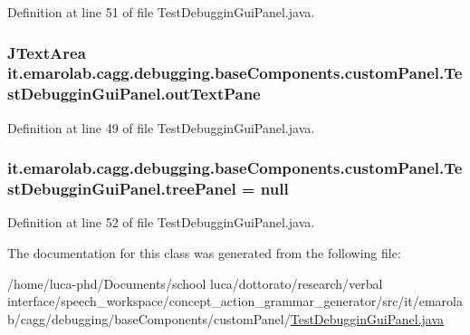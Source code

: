 Definition at line 51 of file Test\-Debuggin\-Gui\-Panel.\-java.

\hypertarget{classit_1_1emarolab_1_1cagg_1_1debugging_1_1baseComponents_1_1customPanel_1_1TestDebugginGuiPanel_a34bd5791b202b681798d7f3928550ec5}{
\subsubsection[{out\-Text\-Pane}]{\setlength{\rightskip}{0pt plus 5cm}J\-Text\-Area it.\-emarolab.\-cagg.\-debugging.\-base\-Components.\-custom\-Panel.\-Test\-Debuggin\-Gui\-Panel.\-out\-Text\-Pane\hspace{0.3cm}{\ttfamily [private]}}}\label{classit_1_1emarolab_1_1cagg_1_1debugging_1_1baseComponents_1_1customPanel_1_1TestDebugginGuiPanel_a34bd5791b202b681798d7f3928550ec5}


Definition at line 49 of file Test\-Debuggin\-Gui\-Panel.\-java.

\hypertarget{classit_1_1emarolab_1_1cagg_1_1debugging_1_1baseComponents_1_1customPanel_1_1TestDebugginGuiPanel_aa6da15d3e740440a5825086412761edd}{
\subsubsection[{tree\-Panel}]{ it.\-emarolab.\-cagg.\-debugging.\-base\-Components.\-custom\-Panel.\-Test\-Debuggin\-Gui\-Panel.\-tree\-Panel = null\hspace{0.3cm}{\ttfamily [private]}}}\label{classit_1_1emarolab_1_1cagg_1_1debugging_1_1baseComponents_1_1customPanel_1_1TestDebugginGuiPanel_aa6da15d3e740440a5825086412761edd}


Definition at line 52 of file Test\-Debuggin\-Gui\-Panel.\-java.



The documentation for this class was generated from the following file\-:\begin{DoxyCompactItemize}
\item 
/home/luca-\/phd/\-Documents/school luca/dottorato/research/verbal interface/speech\-\_\-workspace/concept\-\_\-action\-\_\-grammar\-\_\-generator/src/it/emarolab/cagg/debugging/base\-Components/custom\-Panel/\hyperlink{TestDebugginGuiPanel_8java}{Test\-Debuggin\-Gui\-Panel.\-java}\end{DoxyCompactItemize}
